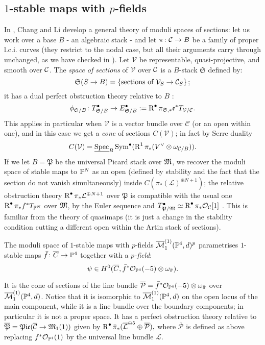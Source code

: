 \subsection{$1$-stable maps with $p$-fields} In \cite{CLpfields}, Chang and Li develop a general theory of moduli spaces of sections: let us work over a base $B$ - an algebraic stack - and let $\pi\colon \mathcal{C}\rightarrow B$ be a family of proper l.c.i. curves (they restrict to the nodal case, but all their arguments carry through unchanged, as we have checked in \cite[\S 3]{BCM}). Let $\mathcal V$ be representable, quasi-projective, and smooth over $\mathcal{C}$. The \emph{space of sections} of $\mathcal V$ over $\mathcal{C}$ is a $B$-stack $\mathfrak S$ defined by:
 \[\mathfrak{S}(S\rightarrow B)=\left\{\text{sections of}\ \mathcal V_S\rightarrow\mathcal{C}_S\right\};\]
it has a dual perfect obstruction theory relative to $B$ \cite[Proposition 2.5]{CLpfields}:
\[ \phi_{\mathfrak S/B}\colon T^{\bullet}_{\mathfrak S/B}\rightarrow E^{\bullet}_{\mathfrak S/B}:=\operatorname{R}^{\bullet}\pi_{\mathfrak S,*}\mathfrak e^* T_{\mathcal V/\mathcal{C}}.\]
This applies in particular when $\mathcal V$ is a vector bundle over $\mathcal C$ (or an open within one), and in this case we get a \emph{cone} of sections $C(\mathcal V)$; in fact by Serre duality \[C(\mathcal V)=\underline{\operatorname{Spec}}_B\operatorname{Sym}^\bullet(\operatorname{R}^1\pi_* (V^\vee\otimes \omega_{\mathcal C/B})).\] If we let $B=\mathfrak{P}$ be the universal Picard stack over $\mathfrak M$, we recover the moduli space of stable maps to $\mathbb P^N$ as an open (defined by stability and the fact that the section do not vanish simultaneously) inside $C(\pi_*(\mathcal L)^{\oplus N+1})$; the relative obstruction theory $\operatorname{R}^{\bullet}\pi_*\mathcal L^{\oplus N+1}$ over $\mathfrak{P}$ is compatible with the usual one $\operatorname{R}^{\bullet}\pi_*f^*T_{\mathbb P^N}$  over $\mathfrak M$, by the Euler sequence and $T^{\bullet}_{\mathfrak P/\mathfrak M}\simeq\operatorname{R}^{\bullet}\pi_*\mathcal{O}_{\mathcal C}[1]$ \cite[Lemma 2.8]{CLpfields}. This is familiar from the theory of quasimaps (it is just a change in the stability condition cutting a different open within the Artin stack of sections).
\begin{dfn}
 The moduli space of $1$-stable maps with $p$-fields $\overline{\mathcal{M}}_1^{(1)}(\mathbb P^4,d)^p$ parametrises $1$-stable maps $\bar{f}\colon\overline{C}\rightarrow\mathbb P^4$ together with a \emph{$p$-field}: \[\psi \in  H^0(\overline{C},\bar{f}^*\mathcal{O}_{\mathbb P^4}(-5)\otimes\omega_{\bar{\pi}}).\]
\end{dfn}
 \noindent It is the cone of sections of the line bundle $\overline{\mathcal P}=\bar{f}^*\mathcal{O}_{\mathbb P^4}(-5)\otimes\omega_{\bar{\pi}}$ over $\overline{\mathcal{M}}_1^{(1)}(\mathbb P^4,d)$. Notice that it is isomorphic to $\overline{\mathcal{M}}_1^{(1)}(\mathbb P^4,d)$ on the open locus of the main component, while it is a line bundle over the boundary components; in particular it is not a proper space. It has a perfect obstruction theory relative to $\overline{\mathfrak P}=\mathfrak{Pic}(\overline{\mathcal C}\rightarrow\mathfrak M_1(1))$ given by $\operatorname{R}^{\bullet}\bar{\pi}_*(\overline{\mathcal L}^{\oplus 5}\oplus \overline{\mathcal P}),$
 where $\overline{\mathcal P}$ is defined as above replacing $\bar{f}^*\mathcal{O}_{\mathbb P^4}(1)$ by the universal line bundle $\overline{\mathcal L}$.

